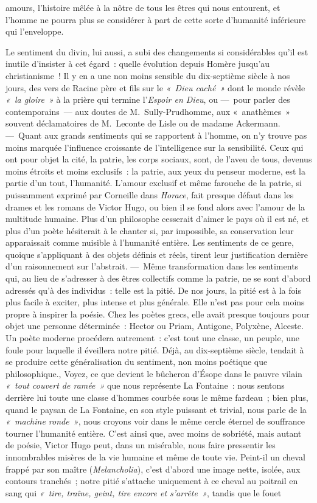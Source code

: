 \documentclass[french,twoside]{book} %
\begin{document}
amours, l’histoire mêlée à la nôtre de tous les êtres qui nous entourent, et l’homme ne pourra plus se considérer à part de cette sorte d’humanité inférieure qui l’enveloppe.\par
Le sentiment du divin, lui aussi, a subi des changements si considérables qu’il est inutile d’insister à cet égard : quelle évolution depuis Homère jusqu’au christianisme ! Il y en a une non moins sensible du dix-septième siècle à nos jours, des vers de Racine père et fils sur le \emph{« Dieu caché »} dont le monde révèle \emph{« la gloire »} à la prière qui termine l’\emph{Espoir en Dieu}, ou — pour parler des contemporains — aux doutes de M. Sully-Prudhomme, aux « anathèmes »  souvent déclamatoires de M. Leconte de Lisle ou de madame Ackermann. — Quant aux grands sentiments qui se rapportent à l’homme, on n’y trouve pas moins marquée l’influence croissante de l’intelligence sur la sensibilité. Ceux qui ont pour objet la cité, la patrie, les corps sociaux, sont, de l’aveu de tous, devenus moins étroits et moins exclusifs : la patrie, aux yeux du penseur moderne, est la partie d’un tout, l’humanité. L’amour exclusif et même farouche de la patrie, si puissamment exprimé par Corneille dans \emph{Horace}, fait presque défaut dans les drames et les romans de Victor Hugo, ou bien il se fond alors avec l’amour de la multitude humaine. Plus d’un philosophe cesserait d’aimer le pays où il est né, et plus d’un poète hésiterait à le chanter si, par impossible, sa conservation leur apparaissait comme nuisible à l’humanité entière. Les sentiments de ce genre, quoique s’appliquant à des objets définis et réels, tirent leur justification dernière d’un raisonnement sur l’abstrait. — Même transformation dans les sentiments qui, au lieu de s’adresser à des êtres collectifs comme la patrie, ne se sont d’abord adressés qu’à des individus : telle est la pitié. De nos jours, la pitié est à la fois plus facile à exciter, plus intense et plus générale. Elle n’est pas pour cela moins propre à inspirer la poésie. Chez les poètes grecs, elle avait presque toujours pour objet une personne déterminée : Hector ou Priam, Antigone, Polyxène, Alceste. Un poète moderne procédera autrement : c’est tout une classe, un peuple, une foule pour laquelle il éveillera notre pitié. Déjà, au dix-septième siècle, tendait à se produire cette généralisation du sentiment,  non moins poétique que philosophique., Voyez, ce que devient le bûcheron d’Ésope dans le pauvre vilain \emph{« tout couvert de ramée »} que nous représente La Fontaine : nous sentons derrière lui toute une classe d’hommes courbée sous le même fardeau ; bien plus, quand le paysan de La Fontaine, en son style puissant et trivial, nous parle de la \emph{« machine ronde »}, nous croyons voir dans le même cercle éternel de souffrance tourner l’humanité entière. C’est ainsi que, avec moins de sobriété, mais autant de poésie, Victor Hugo peut, dans un misérable, nous faire pressentir les innombrables misères de la vie humaine et même de toute vie. Peint-il un cheval frappé par son maître (\emph{Melancholia}), c’est d’abord une image nette, isolée, aux contours tranchés ; notre pitié s’attache uniquement à ce cheval au poitrail en sang qui \emph{« tire, traîne, geint, tire encore et s’arrête »}, tandis que le fouet 
\end{document}

